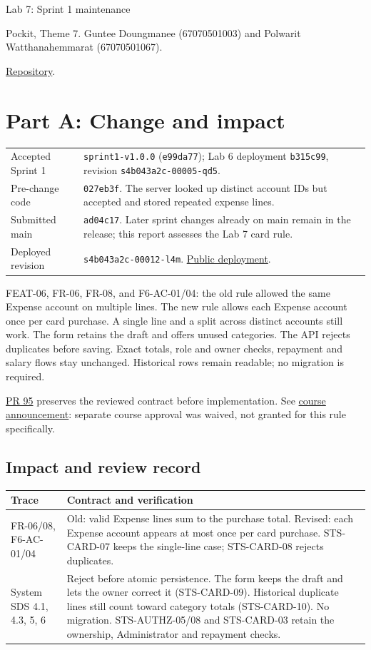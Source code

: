 \documentclass[11pt,a4paper]{article}
\newcommand{\gh}[2]{\href{https://github.com/CPE334-Pockit/Pockit/#1}{#2}}
\begin{document}
\begin{center}\Large Lab 7: Sprint 1 maintenance\end{center}
Pockit, Theme 7. Guntee Doungmanee (67070501003) and Polwarit Watthanahemmarat (67070501067).\par \gh{}{Repository}.
\tableofcontents
\section{Part A: Change and impact}
\begin{tabularx}{\linewidth}{lX}
Accepted Sprint 1 & \texttt{sprint1-v1.0.0} (\texttt{e99da77}); Lab 6 deployment \texttt{b315c99}, revision \texttt{s4b043a2c-00005-qd5}.\\
Pre-change code & \texttt{027eb3f}. The server looked up distinct account IDs but accepted and stored repeated expense lines.\\
Submitted main & \texttt{ad04c17}. Later sprint changes already on main remain in the release; this report assesses the Lab 7 card rule.\\
Deployed revision & \texttt{s4b043a2c-00012-l4m}. \href{https://s4b043a2c-4d7hbszvwq-as.a.run.app}{Public deployment}.\\
\end{tabularx}

FEAT-06, FR-06, FR-08, and F6-AC-01/04: the old rule allowed the same Expense account on multiple lines. The new rule allows each Expense account once per card purchase. A single line and a split across distinct accounts still work. The form retains the draft and offers unused categories. The API rejects duplicates before saving. Exact totals, role and owner checks, repayment and salary flows stay unchanged. Historical rows remain readable; no migration is required.

\gh{pull/95}{PR 95} preserves the reviewed contract before implementation. See \gh{issues/79\#issuecomment-7223322148}{course announcement}: separate course approval was waived, not granted for this rule specifically.
\subsection{Impact and review record}
\begin{tabularx}{\linewidth}{lX}
Trace & Contract and verification \\\hline
FR-06/08, F6-AC-01/04 & Old: valid Expense lines sum to the purchase total. Revised: each Expense account appears at most once per card purchase. STS-CARD-07 keeps the single-line case; STS-CARD-08 rejects duplicates. \\
System SDS 4.1, 4.3, 5, 6 & Reject before atomic persistence. The form keeps the draft and lets the owner correct it (STS-CARD-09). Historical duplicate lines still count toward category totals (STS-CARD-10). No migration. STS-AUTHZ-05/08 and STS-CARD-03 retain the ownership, Administrator and repayment checks. \\
\end{tabularx}
\end{document}
